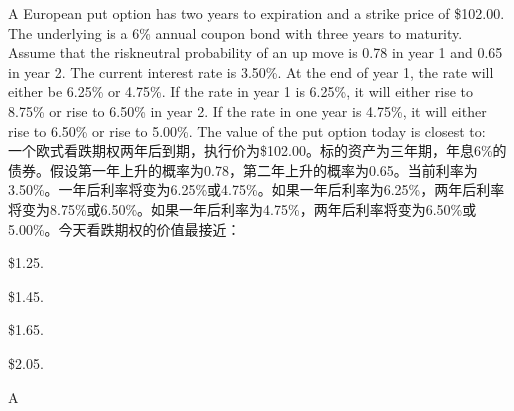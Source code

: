 \documentclass{article}
\newcounter{question} %
\begin{document}
\begin{question}
    A European put option has two years to expiration and a strike price of \$102.00. The
    underlying is a 6\% annual coupon bond with three years to maturity. Assume that the riskneutral probability of an up move is 0.78 in year 1 and 0.65 in year 2. The current interest
    rate is 3.50\%. At the end of year 1, the rate will either be 6.25\% or 4.75\%. If the rate in
    year 1 is 6.25\%, it will either rise to 8.75\% or rise to 6.50\% in year 2. If the rate in one year is 4.75\%, it will either rise to 6.50\% or rise to 5.00\%. The value of the put option today
    is closest to:
    \\一个欧式看跌期权两年后到期，执行价为\$102.00。标的资产为三年期，年息6\%的债券。假设第一年上升的概率为0.78，第二年上升的概率为0.65。当前利率为3.50\%。一年后利率将变为6.25\%或4.75\%。如果一年后利率为6.25\%，两年后利率将变为8.75\%或6.50\%。如果一年后利率为4.75\%，两年后利率将变为6.50\%或5.00\%。今天看跌期权的价值最接近：
\end{question}

\begin{choices}
    \item \$1.25.
    \item \$1.45.
    \item \$1.65.
    \item \$2.05.
\end{choices}

\begin{correctanswer}
    A
\end{correctanswer}
\end{document}
